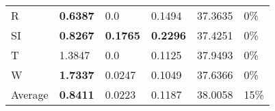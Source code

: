 \documentclass[11pt, a4paper]{article}
\begin{document}
\begin{table}[H]
\begin{tabular}{llllll}
R                                & \textbf{0.6387}                   & 0.0                               & 0.1494                               & 37.3635                                     & 0\%                               \\
SI                        & \textbf{0.8267}                   & \textbf{0.1765}                   & \textbf{0.2296}                      & 37.4251                                     & 0\%                               \\
T                              & 1.3847                            & 0.0                               & 0.1125                               & 37.9493                                     & 0\%                               \\
W                             & \textbf{1.7337}                   & 0.0247                            & 0.1049                               & 37.6366                                     & 0\%                               \\ \hline
Average                               & \textbf{0.8411}                   & 0.0223                            & 0.1187                               & 38.0058                                     & 15\%
\end{tabular}
\end{table}
\end{document}
